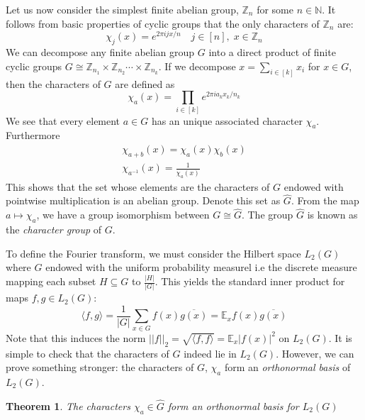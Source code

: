 \documentclass{amsart}
\newtheorem{theorem}{Theorem}[section]
\theoremstyle{definition}
\theoremstyle{remark}
\numberwithin{equation}{section}
\begin{document}
Let us now consider the simplest finite abelian group, $\mathbb{Z}_n$ for some $n \in \mathbb{N}$. It follows from basic properties of cyclic groups that the only characters of $\mathbb{Z}_n$ are:
%
\begin{equation}
  \chi_j(x) = e^{ 2\pi i jx/n} \quad j \in [n], \; x \in \mathbb{Z}_n
\end{equation}
%
We can decompose any finite abelian group $G$ into a direct product of finite cyclic groups $G \cong \mathbb{Z}_{n_1} \times \mathbb{Z}_{n_2} \cdots \times\mathbb{Z}_{n_k}$. If we decompose $x = \sum_{i \in [k]} x_i$ for $x \in G$, then the characters of $G$ are defined as
%
\begin{equation}
  \chi_a(x) = \prod_{i \in [k]} e^{2 \pi i a_k x_k/ n_k}
\end{equation}
%
We see that every element $a \in G$ has an unique associated character $\chi_a$. Furthermore
%
\begin{gather} \label{chargroup}
  \chi_{a+b}(x)  = \chi_{a}(x)\chi_{b}(x) \\
  \chi_{a^{-1}}(x) = \frac{1}{\chi_a(x)}
\end{gather}
%
This shows that the set whose elements are the characters of $G$ endowed with pointwise multiplication is an abelian group. Denote this set as $\hat{G}$. From the map $a \mapsto \chi_a$, we have a group isomorphism between $G \cong \hat{G}$. The group $\hat{G}$ is known as the \emph{character group} of $G$. \newline

To define the Fourier transform, we must consider the Hilbert space $L_2(G)$ where $G$ endowed with the uniform probability measurel i.e the discrete measure mapping each subset $H \subseteq G$ to $\frac{|H|}{|G|}$. This yields the standard inner product for maps $f,g \in L_2(G)$:
%
\begin{equation}
  \langle f,g \rangle = \frac{1}{|G|}\sum_{x\in G} f(x)\overline{g(x)}= \mathbb{E}_x f(x)\overline{g(x)}
\end{equation}
Note that this induces the norm $||f||_2 = \sqrt{\langle f, f \rangle} = \mathbb{E}_x |f(x)|^2$ on $L_2(G)$. It is simple to check that the characters of $G$ indeed lie in $L_2(G)$. However, we can prove something stronger: the characters of $G$, $\chi_a$ form an \emph{orthonormal basis} of $L_2(G)$.
%

\begin{theorem}
  The characters $\chi_a \in \hat{G}$ form an orthonormal basis for $L_2(G)$
\end{theorem}
\end{document}
